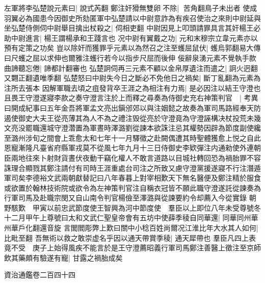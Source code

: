 左軍將李弘楚說元素曰|{
	說式芮翻}
鄭注奸猾無雙卵不除|{
	苦角翻鳥子未出者}
使成羽翼必為國患今因御史所劾匿軍中弘楚請以中尉意詐為有疾召使治之來則中尉延與坐弘楚侍側伺中尉舉目擒出杖殺之|{
	伺相吏翻}
中尉因見上叩頭請罪具言其奸楊王必助中尉進言|{
	楊王謂楊承和王踐言也}
况中尉有翼戴之功|{
	元和末穆宗立韋元素亦以預有定策之功矣}
豈以除奸而獲罪乎元素以為然召之注至蠖屈鼠伏|{
	蠖烏郭翻易大傳曰尺蠖之屈以求伸也爾雅注蠖行若今以指步尺屈而後伸}
佞辭泉湧元素不覺執手款曲諦聽忘倦|{
	諦都計翻審也}
弘楚詗伺再三元素不顧以金帛厚遺注而遣之|{
	詗火迥翻又翾正翻遺唯季翻}
弘楚怒曰中尉失今日之斷必不免他日之禍矣|{
	斷丁亂翻為元素為注所去張本}
因解軍職去頃之疽發背卒王涯之為相注有力焉|{
	是必因注以結王守澄也}
且畏王守澄遂寢李款之奏守澄言注於上而釋之尋奏為侍御史充右神策判官　|{
	考異曰開成紀事曰五年金吾將軍孟文亮出鎭邠郊以與注姻懿之故奏為軍司馬路經奉天防遏使御史大夫王從亮薄其為人不為之禮注毁從亮於守澄竟為守澄誣構决杖投荒未幾文亮没罷職還城守澄濳置為軍晝時澤潞劉從諫本欲誅注忌其權勢因辟為節度副使纔至潞州涉旬之間會上乖愈太和七年十一月驛徵之赴闕偶遭其時聖體獲愈上悦之自此恩寵漸隆凡臺省府縣軍戎莫不從風七年九月十三日侍御史李欵彈注内通勑使外連朝臣兩地往來卜射財貨晝伏夜動干竊化權人不敢言道路以目城社轉回恐為禍胎罪不容誅理合顯戮其鄭注請付有司時王涯重處台司注之所致又慮守澄黨援遂寢不行注潛遁軍司矣李德裕文武兩朝獻替記曰八年春暮上對宰相歎天下無名醫便及鄭注精於服食或欲置於翰林技術院或欲令為左神策判官注自稱衣冠皆不願此職守澄遂託從諫奏為行軍司馬及赴職宗閔又自山南令判官楊儉至澤潞與從諫要約令却薦入今從實錄}
朝野駭歎　甲寅以前忠武節度使王智興為河中節度使　羣臣以上即位八年未受尊號冬十二月甲午上尊號曰太和文武仁聖皇帝會有五坊中使薛季稜自同華還|{
	同華同州華州華戶化翻還音旋}
言閭閻彫弊上歎曰關中小稔百姓尚爾况江淮比年大水其人如何|{
	比毗至翻}
吾無術以救之敢崇虚名乎因以通天帶賞季稜|{
	通天犀帶也}
羣臣凡四上表竟不受　庚子上始得風疾不能言於是王守澄薦昭義行軍司馬鄭注善醫上徵注至京師飲其藥頗有驗遂有寵|{
	甘露之禍胎成矣}


資治通鑑卷二百四十四
